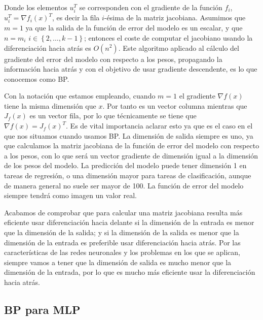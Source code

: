 Donde los elementos $u_i^T$ se corresponden con el gradiente de la función $f_i$, $u_i^T=\nabla f_i(x)^T$, es decir la fila $i$-ésima de la matriz jacobiana. Asumimos que $m=1$ ya que la salida de la función de error del modelo es un escalar, y que $n=m_i$ $i \in \left \{2,\ldots, k-1 \right \}$; entonces el coste de computar el jacobiano usando la diferenciación hacia atrás es $O(n^2)$. Este algoritmo aplicado al cálculo del gradiente del error del modelo con respecto a los pesos, propagando la información hacia atrás y con el objetivo de usar gradiente descendente, es lo que conocemos como BP. 

Con la notación que estamos empleando, cuando $m=1$ el gradiente $\nabla f(x)$ tiene la misma dimensión que $x$. Por tanto es un vector columna mientras que $J_f(x)$ es un vector fila, por lo que técnicamente se tiene que $\nabla f(x)= J_f(x)^T$. Es de vital importancia aclarar esto ya que es el caso en el que nos situamos cuando usamos BP. La dimensión de salida siempre es uno, ya que calculamos la matriz jacobiana de la función de error del modelo con respecto a los pesos, con lo que será un vector gradiente de dimensión igual a la dimensión de los pesos del modelo. La predicción del modelo puede tener dimensión 1 en tareas de regresión, o una dimensión mayor para tareas de clasificación, aunque de manera general no suele ser mayor de 100. La función de error del modelo siempre tendrá como imagen un valor real.


Acabamos de comprobar que para calcular una matriz jacobiana resulta más eficiente usar diferenciación hacia delante si la dimensión de la entrada es menor que la dimensión de la salida; y si la dimensión de la salida es menor que la dimensión de la entrada es preferible usar diferenciación hacia atrás. Por las características de las redes neuronales y los problemas en los que se aplican, siempre vamos a tener que la dimensión de salida es mucho menor que la dimensión de la entrada, por lo que es mucho más eficiente usar la diferenciación hacia atrás. 




\subsection{BP para MLP}


